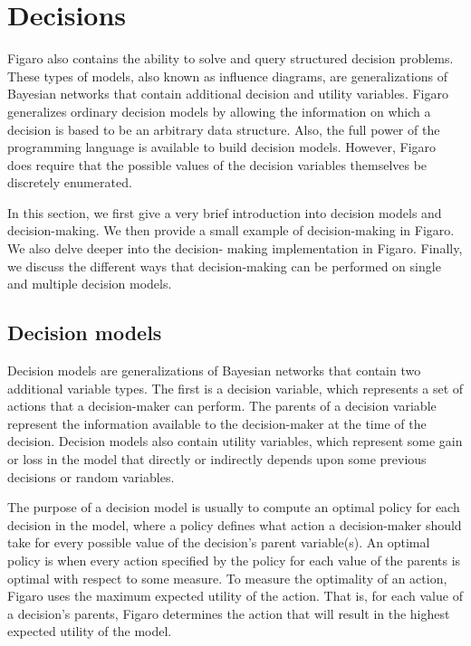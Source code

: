 
\chapter{Decisions} %

\label{Decisions} %

Figaro also contains the ability to solve and query structured decision problems. These types of models, also known as influence diagrams, are generalizations of Bayesian networks that contain additional decision and utility variables. Figaro generalizes ordinary decision models by allowing the information on which a decision is based to be an arbitrary data structure. Also, the full power of the programming language is available to build decision models. However, Figaro does require that the possible values of the decision variables themselves be discretely enumerated.

In this section, we first give a very brief introduction into decision models and decision-making. We then provide a small example of decision-making in Figaro. We also delve deeper into the decision- making implementation in Figaro. Finally, we discuss the different ways that decision-making can be performed on single and multiple decision models.

\section{Decision models}

Decision models are generalizations of Bayesian networks that contain two additional variable types. The first is a decision variable, which represents a set of actions that a decision-maker can perform. The parents of a decision variable represent the information available to the decision-maker at the time of the decision. Decision models also contain utility variables, which represent some gain or loss in the model that directly or indirectly depends upon some previous decisions or random variables.

The purpose of a decision model is usually to compute an optimal policy for each decision in the model, where a policy defines what action a decision-maker should take for every possible value of the decision's parent variable(s). An optimal policy is when every action specified by the policy for each value of the parents is optimal with respect to some measure. To measure the optimality of an action, Figaro uses the maximum expected utility of the action. That is, for each value of a decision's parents, Figaro determines the action that will result in the highest expected utility of the model.


